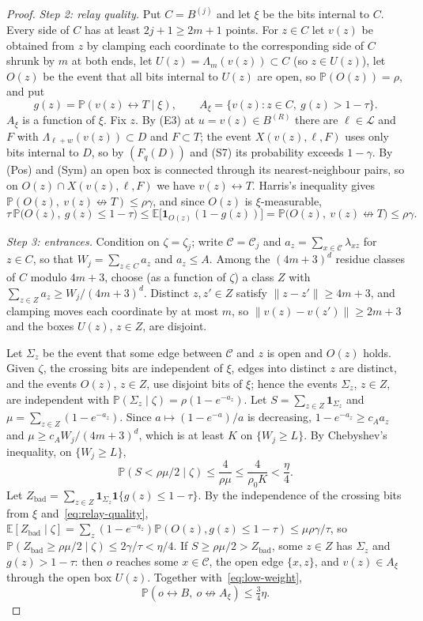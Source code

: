\documentclass[11pt]{article}
\theoremstyle{definition}
\theoremstyle{remark}
\numberwithin{equation}{section}
\newcommand{\Pp}{\mathbb P}
\newcommand{\E}{\mathbb E}
\newcommand{\1}{\mathbf 1}
\newcommand{\cC}{\mathcal C}
\newcommand{\cL}{\mathcal L}
\newcommand{\lr}{\leftrightarrow}
\newcommand{\nlr}{\mathrel{\not\leftrightarrow}}
\newcommand{\Lam}{\Lambda}
\newcommand{\norm}[1]{\|#1\|}
\begin{document}
\begin{proof}
\emph{Step 2: relay quality.} Put $C=B^{(j)}$ and let $\xi$ be the bits internal to $C$. Every side
of $C$ has at least $2j+1\ge2m+1$ points. For $z\in C$ let $v(z)$ be obtained from $z$ by clamping
each coordinate to the corresponding side of $C$ shrunk by $m$ at both ends, let
$U(z)=\Lam_m(v(z))\subset C$ (so $z\in U(z)$), let $O(z)$ be the event that all bits internal to
$U(z)$ are open, so $\Pp(O(z))=\rho$, and put
\[
g(z)=\Pp(v(z)\lr T\mid\xi),\qquad A_\xi=\{v(z):z\in C,\ g(z)>1-\tau\}.
\]
$A_\xi$ is a function of $\xi$. Fix $z$. By (E3) at $u=v(z)\in B^{(R)}$ there are $\ell\in\cL$ and $F$
with $\Lam_{\ell+w}(v(z))\subset D$ and $F\subset T$; the event $X(v(z),\ell,F)$ uses only bits
internal to $D$, so by $(F_q(D))$ and (S7) its probability exceeds $1-\gamma$. By (Pos) and (Sym)
an open box is connected through its nearest-neighbour pairs, so on $O(z)\cap X(v(z),\ell,F)$ we
have $v(z)\lr T$. Harris's inequality gives $\Pp(O(z),\ v(z)\nlr T)\le\rho\gamma$, and since $O(z)$
is $\xi$-measurable,
\begin{equation}\label{eq:relay-quality}
\tau\,\Pp\bigl(O(z),\ g(z)\le1-\tau\bigr)\le\E\bigl[\1_{O(z)}(1-g(z))\bigr]=\Pp\bigl(O(z),\ v(z)\nlr T\bigr)\le\rho\gamma.
\end{equation}

\emph{Step 3: entrances.} Condition on $\zeta=\zeta_j$; write $\cC=\cC_j$ and
$a_z=\sum_{x\in\cC}\lambda_{xz}$ for $z\in C$, so that $W_j=\sum_{z\in C}a_z$ and $a_z\le A$. Among the
$(4m+3)^d$ residue classes of $C$ modulo $4m+3$, choose (as a function of $\zeta$) a class $Z$ with
$\sum_{z\in Z}a_z\ge W_j/(4m+3)^d$. Distinct $z,z'\in Z$ satisfy $\norm{z-z'}\ge4m+3$, and clamping
moves each coordinate by at most $m$, so $\norm{v(z)-v(z')}\ge2m+3$ and the boxes $U(z)$, $z\in Z$,
are disjoint.

Let $\Sigma_z$ be the event that some edge between $\cC$ and $z$ is open and $O(z)$ holds. Given
$\zeta$, the crossing bits are independent of $\xi$, edges into distinct $z$ are distinct, and the
events $O(z)$, $z\in Z$, use disjoint bits of $\xi$; hence the events $\Sigma_z$, $z\in Z$, are
independent with $\Pp(\Sigma_z\mid\zeta)=\rho(1-e^{-a_z})$. Let $S=\sum_{z\in Z}\1_{\Sigma_z}$ and
$\mu=\sum_{z\in Z}(1-e^{-a_z})$. Since $a\mapsto(1-e^{-a})/a$ is decreasing, $1-e^{-a_z}\ge c_Aa_z$
and $\mu\ge c_AW_j/(4m+3)^d$, which is at least $K$ on $\{W_j\ge L\}$. By Chebyshev's inequality,
on $\{W_j\ge L\}$,
\[
\Pp(S<\rho\mu/2\mid\zeta)\le\frac{4}{\rho\mu}\le\frac4{\rho_0K}<\frac\eta4 .
\]
Let $Z_{\mathrm{bad}}=\sum_{z\in Z}\1_{\Sigma_z}\1\{g(z)\le1-\tau\}$. By the independence of the
crossing bits from $\xi$ and~\eqref{eq:relay-quality},
$\E[Z_{\mathrm{bad}}\mid\zeta]=\sum_z(1-e^{-a_z})\Pp(O(z),g(z)\le1-\tau)\le\mu\rho\gamma/\tau$, so
$\Pp(Z_{\mathrm{bad}}\ge\rho\mu/2\mid\zeta)\le2\gamma/\tau<\eta/4$. If $S\ge\rho\mu/2>Z_{\mathrm{bad}}$,
some $z\in Z$ has $\Sigma_z$ and $g(z)>1-\tau$: then $o$ reaches some $x\in\cC$, the open edge
$\{x,z\}$, and $v(z)\in A_\xi$ through the open box $U(z)$. Together with~\eqref{eq:low-weight},
\[
\Pp(o\lr B,\ o\nlr A_\xi)\le\tfrac34\eta .
\]


\end{proof}
\end{document}
